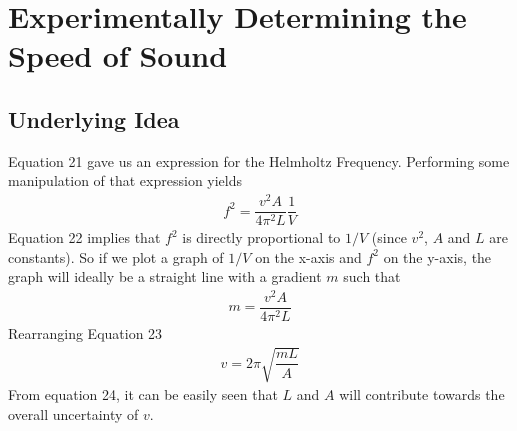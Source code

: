 \documentclass[10pt, a4paper]{article}
\begin{document}
\newpage

\section*{Experimentally Determining the Speed of Sound}
\subsection*{Underlying Idea}
Equation 21 gave us an expression for the Helmholtz Frequency. Performing some manipulation of that expression yields 
\begin{align}
    f^2 = \dfrac{v^2A}{4 \pi^2 L} \dfrac{1}{V}
\end{align}
Equation 22 implies that $f^2$ is directly proportional to $1/V$ (since $v^2$, $A$ and $L$ are constants). So if we plot a graph of $1/V$ on the x-axis and $f^2$ on the y-axis, the graph will ideally be a straight line with a gradient $m$ such that 
\begin{align}
    m = \dfrac{v^2 A}{4 \pi^2 L}
\end{align}
Rearranging Equation 23 
\begin{align}
    v = 2\pi \sqrt{\dfrac{m L}{A}}
\end{align}
From equation 24, it can be easily seen that $L$ and $A$ will contribute towards the overall uncertainty of $v$. 
\end{document}
